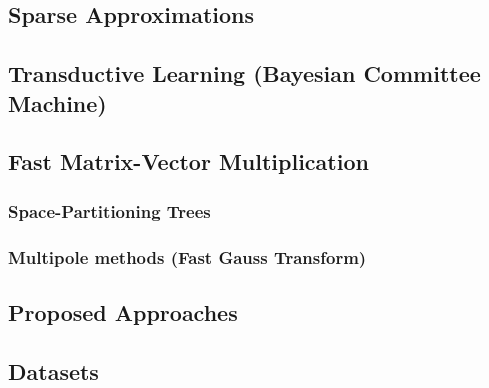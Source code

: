 \documentclass{article}
\begin{document}
\subsection{Sparse Approximations}

\subsection{Transductive Learning (Bayesian Committee Machine)}

\subsection{Fast Matrix-Vector Multiplication}

\subsubsection{Space-Partitioning Trees}
\subsubsection{Multipole methods (Fast Gauss Transform)}

\subsection{Proposed Approaches}

\subsection{Datasets}

\newpage


\end{document}
